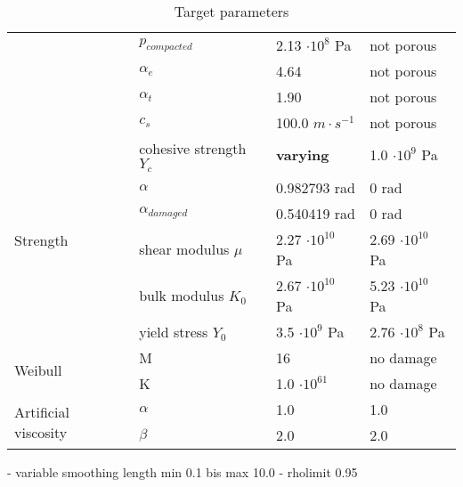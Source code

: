 \begin{table}
\begin{tabular}{ |l|l|l|l| }
                                              & $p_{compacted}$         & 2.13 $\cdot 10^8$ Pa             & not porous                       \\
                                              & $\alpha_e$              & 4.64                             & not porous                       \\
                                              & $\alpha_t$              & 1.90                             & not porous                       \\
                                              & $c_s$                   & 100.0 $m\cdot s^{-1}$            & not porous                       \\ \hline
        \multirow{6}{*}{Strength}             & cohesive strength $Y_c$ & \textbf{varying}                 & 1.0 $\cdot 10^9$ Pa              \\
                                              & $\alpha$                & 0.982793 rad                     & 0 rad                            \\
                                              & $\alpha_{damaged}$      & 0.540419 rad                     & 0 rad                            \\
                                              & shear modulus $\mu$     & 2.27 $\cdot 10^{10}$ Pa          & 2.69 $\cdot 10^{10}$ Pa          \\
                                              & bulk modulus $K_0$      & 2.67 $\cdot 10^{10}$ Pa          & 5.23 $\cdot 10^{10}$ Pa          \\
                                              & yield stress $Y_0$      & 3.5 $\cdot 10^9$ Pa              & 2.76 $\cdot 10^8$ Pa             \\ \hline
        \multirow{2}{*}{Weibull}              & M                       & 16                               & no damage                        \\
                                              & K                       & 1.0 $\cdot 10^{61}$              & no damage                        \\ \hline
        \multirow{2}{*}{Artificial viscosity} & $\alpha$                & 1.0                              & 1.0                              \\
                                              & $\beta$                 & 2.0                              & 2.0                              \\ \hline
        \hline
    \end{tabular}
    \caption{Target parameters}
    \label{fig:target_parameters}
\end{table}

- variable smoothing length min 0.1 bis max 10.0
- rholimit 0.95